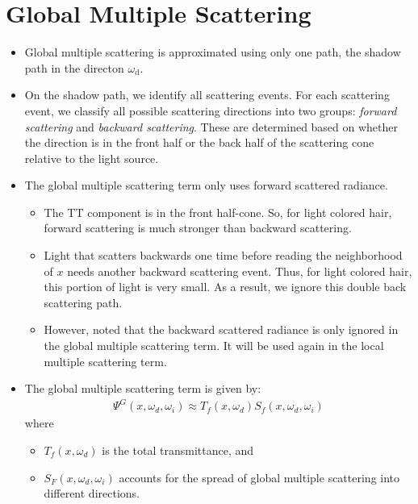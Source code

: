 \documentclass[10pt]{article}
\newcommand{\dee}{\mathrm{d}}
\begin{document}
  \section{Global Multiple Scattering} %
  \label{sub:global_multiple_scattering}
  \begin{itemize}
    \item Global multiple scattering is approximated using only one path, the shadow path in the directon $\omega_\dee$.

    \item On the shadow path, we identify all scattering events.  For each scattering event, we classify all possible scattering directions into two groups: \emph{forward scattering} and \emph{backward scattering}.  These are determined based on whether the direction is in the front half or the back half of the scattering cone relative to the light source.

    \item The global multiple scattering term only uses forward scattered radiance.

    \begin{itemize}
      \item The TT component is in the front half-cone.  So, for light colored hair, forward scattering is much stronger than backward scattering.

      \item Light that scatters backwards one time before reading the neighborhood of $x$ needs another backward scattering event.  Thus, for light colored hair, this portion of light is very small.  As a result, we ignore this double back scattering path.

      \item However, noted that the backward scattered radiance is only ignored in the global multiple scattering term.  It will be used again in the local multiple scattering term.      
    \end{itemize}

    \item The global multiple scattering term is given by:
    \begin{align*}
      \Psi^G(x, \omega_d, \omega_i) \approx T_f(x, \omega_d) S_f(x, \omega_d, \omega_i)
    \end{align*}
    where
    \begin{itemize}
      \item $T_f(x, \omega_d)$ is the total transmittance, and
      \item $S_F(x, \omega_d, \omega_i)$ accounts for the spread of global multiple scattering into different directions.
    \end{itemize}
  \end{itemize}
\end{document}
